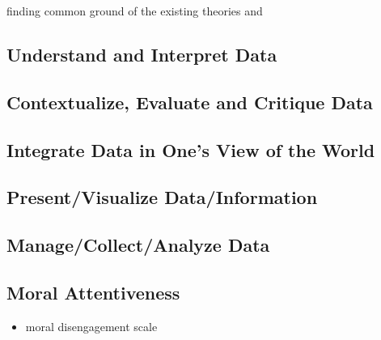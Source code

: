 \documentclass[
  12pt,
  a4paper,
  twoside]{article}
\providecommand{\tightlist}{%
  \setlength{\itemsep}{0pt}\setlength{\parskip}{0pt}}
\begin{document}
finding common ground of the existing theories and

\hypertarget{understand-and-interpret-data}{%
\subsection{Understand and Interpret Data}\label{understand-and-interpret-data}}

\hypertarget{contextualize-evaluate-and-critique-data}{%
\subsection{Contextualize, Evaluate and Critique Data}\label{contextualize-evaluate-and-critique-data}}

\hypertarget{integrate-data-in-ones-view-of-the-world}{%
\subsection{Integrate Data in One's View of the World}\label{integrate-data-in-ones-view-of-the-world}}

\hypertarget{presentvisualize-datainformation}{%
\subsection{Present/Visualize Data/Information}\label{presentvisualize-datainformation}}

\hypertarget{managecollectanalyze-data}{%
\subsection{Manage/Collect/Analyze Data}\label{managecollectanalyze-data}}

\hypertarget{moral-attentiveness}{%
\subsection{Moral Attentiveness}\label{moral-attentiveness}}

\begin{itemize}
\tightlist
\item
  moral disengagement scale
\end{itemize}
\end{document}
